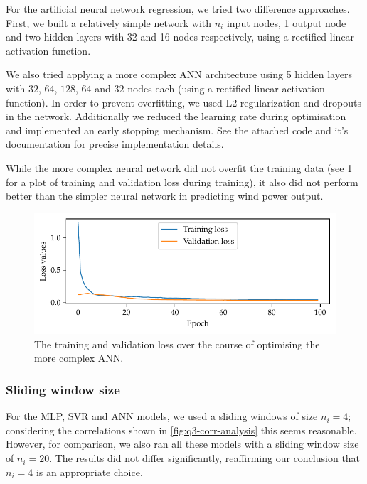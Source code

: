 \documentclass[11pt]{article}
\begin{document}
For the artificial neural network regression, we tried two difference approaches.
First, we built a relatively simple network with $n_i$ input nodes, 1 output node and two hidden layers with 32 and 16 nodes respectively, using a rectified linear activation function.

We also tried applying a more complex ANN architecture using 5 hidden layers with $32$, $64$, $128$, $64$ and $32$ nodes each (using a rectified linear activation function).
In order to prevent overfitting, we used L2 regularization and dropouts in the network.
Additionally we reduced the learning rate during optimisation and implemented an early stopping mechanism.
See the attached code and it's documentation for precise implementation details.

While the more complex neural network did not overfit the training data (see \cref{fig:q3-ANN-training} for a plot of training and validation loss during training), it also did not perform better than the simpler neural network in predicting wind power output.

\begin{figure}
  \centering
  \includegraphics{figures/q3_ANN_training}
  \caption{The training and validation loss over the course of optimising the more complex ANN.}
  \label{fig:q3-ANN-training}
\end{figure}

\subsubsection*{Sliding window size}

For the MLP, SVR and ANN models, we used a sliding windows of size $n_i = 4$; considering the correlations shown in \cref{fig:q3-corr-analysis} this seems reasonable.
However, for comparison, we also ran all these models with a sliding window size of $n_i = 20$.
The results did not differ significantly, reaffirming our conclusion that $n_i = 4$ is an appropriate choice.
\end{document}
